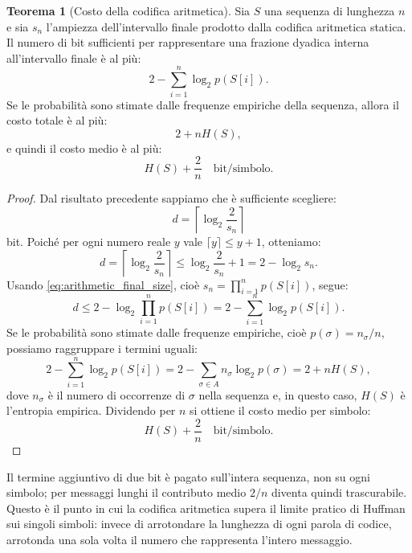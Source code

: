 \documentclass{article}
\theoremstyle{definition}
\newtheorem{theorem}{Teorema}[section] %
\numberwithin{equation}{section}
\begin{document}
\begin{theorem}[Costo della codifica aritmetica]
    Sia $S$ una sequenza di lunghezza $n$ e sia $s_n$ l'ampiezza dell'intervallo finale prodotto dalla codifica aritmetica statica. Il numero di bit sufficienti per rappresentare una frazione dyadica interna all'intervallo finale è al più:
    \[
        2-\sum_{i=1}^{n}\log_2 p(S[i]).
    \]
    Se le probabilità sono stimate dalle frequenze empiriche della sequenza, allora il costo totale è al più:
    \[
        2+nH(S),
    \]
    e quindi il costo medio è al più:
    \[
        H(S)+\frac{2}{n}
        \quad \text{bit/simbolo}.
    \]
\end{theorem}

\begin{proof}
    Dal risultato precedente sappiamo che è sufficiente scegliere:
    \[
        d=\left\lceil\log_2\frac{2}{s_n}\right\rceil
    \]
    bit. Poiché per ogni numero reale $y$ vale $\lceil y\rceil\leq y+1$, otteniamo:
    \[
        d
        =
        \left\lceil\log_2\frac{2}{s_n}\right\rceil
        \leq
        \log_2\frac{2}{s_n}+1
        =
        2-\log_2 s_n.
    \]
    Usando \eqref{eq:arithmetic_final_size}, cioè $s_n=\prod_{i=1}^{n}p(S[i])$, segue:
    \[
        d
        \leq
        2-\log_2\prod_{i=1}^{n}p(S[i])
        =
        2-\sum_{i=1}^{n}\log_2 p(S[i]).
    \]
    Se le probabilità sono stimate dalle frequenze empiriche, cioè $p(\sigma)=n_\sigma/n$, possiamo raggruppare i termini uguali:
    \[
        2-\sum_{i=1}^{n}\log_2 p(S[i])
        =
        2-\sum_{\sigma\in A} n_\sigma \log_2 p(\sigma)
        =
        2+nH(S),
    \]
    dove $n_\sigma$ è il numero di occorrenze di $\sigma$ nella sequenza e, in questo caso, $H(S)$ è l'entropia empirica. Dividendo per $n$ si ottiene il costo medio per simbolo:
    \[
        H(S)+\frac{2}{n}
        \quad \text{bit/simbolo}.
    \]
\end{proof}

Il termine aggiuntivo di due bit è pagato sull'intera sequenza, non su ogni simbolo; per messaggi lunghi il contributo medio $2/n$ diventa quindi trascurabile. Questo è il punto in cui la codifica aritmetica supera il limite pratico di Huffman sui singoli simboli: invece di arrotondare la lunghezza di ogni parola di codice, arrotonda una sola volta il numero che rappresenta l'intero messaggio.
\end{document}
